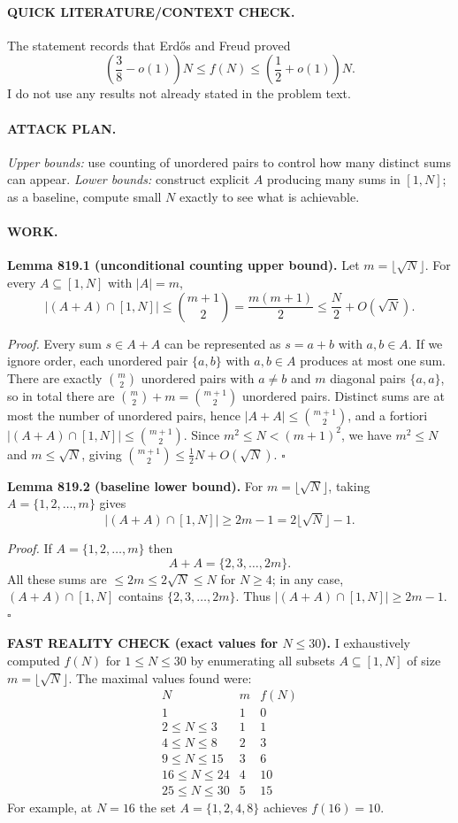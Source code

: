\paragraph{QUICK LITERATURE/CONTEXT CHECK.}
The statement records that Erd\H{o}s and Freud proved
\[
\left(\frac{3}{8}-o(1)\right)N \le f(N) \le \left(\frac{1}{2}+o(1)\right)N.
\]
I do not use any results not already stated in the problem text.

\paragraph{ATTACK PLAN.}
\emph{Upper bounds:} use counting of unordered pairs to control how many distinct sums can appear.
\emph{Lower bounds:} construct explicit $A$ producing many sums in $[1,N]$; as a baseline, compute small $N$ exactly to see what is achievable.

\paragraph{WORK.}
\textbf{Lemma 819.1 (unconditional counting upper bound).}
Let $m=\lfloor \sqrt N\rfloor$. For every $A\subseteq[1,N]$ with $|A|=m$,
\[
|(A+A)\cap[1,N]| \le \binom{m+1}{2} = \frac{m(m+1)}{2} \le \frac{N}{2} + O(\sqrt N).
\]

\emph{Proof.}
Every sum $s\in A+A$ can be represented as $s=a+b$ with $a,b\in A$.
If we ignore order, each unordered pair $\{a,b\}$ with $a,b\in A$ produces at most one sum.
There are exactly $\binom{m}{2}$ unordered pairs with $a\ne b$ and $m$ diagonal pairs $\{a,a\}$, so in total there are $\binom{m}{2}+m=\binom{m+1}{2}$ unordered pairs.
Distinct sums are at most the number of unordered pairs, hence $|A+A|\le \binom{m+1}{2}$, and a fortiori $|(A+A)\cap[1,N]|\le \binom{m+1}{2}$.
Since $m^2\le N < (m+1)^2$, we have $m^2\le N$ and $m\le \sqrt N$, giving $\binom{m+1}{2}\le \frac{1}{2}N + O(\sqrt N)$.
\hfill $\square$

\textbf{Lemma 819.2 (baseline lower bound).}
For $m=\lfloor\sqrt N\rfloor$, taking $A=\{1,2,\dots,m\}$ gives
\[
|(A+A)\cap[1,N]| \ge 2m-1 = 2\lfloor\sqrt N\rfloor-1.
\]

\emph{Proof.}
If $A=\{1,2,\dots,m\}$ then
\[
A+A = \{2,3,\dots,2m\}.
\]
All these sums are $\le 2m\le 2\sqrt N\le N$ for $N\ge4$; in any case, $(A+A)\cap[1,N]$ contains $\{2,3,\dots,2m\}$.
Thus $|(A+A)\cap[1,N]|\ge 2m-1$.
\hfill $\square$

\textbf{FAST REALITY CHECK (exact values for $N\le 30$).}
I exhaustively computed $f(N)$ for $1\le N\le 30$ by enumerating all subsets $A\subseteq[1,N]$ of size $m=\lfloor\sqrt N\rfloor$.
The maximal values found were:
\[
\begin{array}{c|c|c}
N & m & f(N)\\\hline
1 & 1 & 0\\
2\le N\le 3 & 1 & 1\\
4\le N\le 8 & 2 & 3\\
9\le N\le 15 & 3 & 6\\
16\le N\le 24 & 4 & 10\\
25\le N\le 30 & 5 & 15
\end{array}
\]
For example, at $N=16$ the set $A=\{1,2,4,8\}$ achieves $f(16)=10$.

